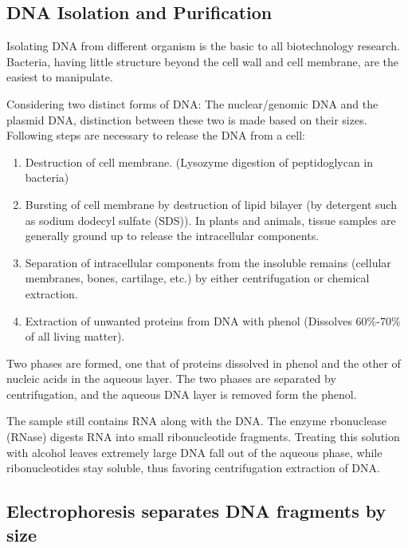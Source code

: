 \documentclass[nofonts,]{tufte-handout}
\providecommand{\tightlist}{%
  \setlength{\itemsep}{0pt}\setlength{\parskip}{0pt}}
\begin{document}
\hypertarget{dna-isolation-and-purification}{%
\subsection{DNA Isolation and
Purification}\label{dna-isolation-and-purification}}

Isolating DNA from different organism is the basic to all biotechnology
research. Bacteria, having little structure beyond the cell wall and
cell membrane, are the easiest to manipulate.

Considering two distinct forms of DNA: The nuclear/genomic DNA and the
plasmid DNA, distinction between these two is made based on their sizes.
Following steps are necessary to release the DNA from a cell:

\begin{enumerate}
\def\labelenumi{\arabic{enumi}.}
\tightlist
\item
  Destruction of cell membrane. (Lysozyme digestion of peptidoglycan in
  bacteria)
\item
  Bursting of cell membrane by destruction of lipid bilayer (by
  detergent such as sodium dodecyl sulfate (SDS)). In plants and
  animals, tissue samples are generally ground up to release the
  intracellular components.
\item
  Separation of intracellular components from the insoluble remains
  (cellular membranes, bones, cartilage, etc.) by either centrifugation
  or chemical extraction.
\item
  Extraction of unwanted proteins from DNA with phenol (Dissolves
  60\%-70\% of all living matter).
\end{enumerate}

Two phases are formed, one that of proteins dissolved in phenol and the
other of nucleic acids in the aqueous layer. The two phases are
separated by centrifugation, and the aqueous DNA layer is removed form
the phenol.

The sample still contains RNA along with the DNA. The enzyme rbonuclease
(RNase) digests RNA into small ribonucleotide fragments. Treating this
solution with alcohol leaves extremely large DNA fall out of the aqueous
phase, while ribonucleotides stay soluble, thus favoring centrifugation
extraction of DNA.

\hypertarget{electrophoresis-separates-dna-fragments-by-size}{%
\subsection{Electrophoresis separates DNA fragments by
size}\label{electrophoresis-separates-dna-fragments-by-size}}
\end{document}
